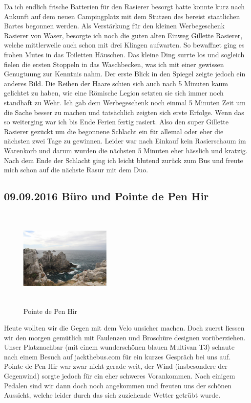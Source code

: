 Da ich endlich frische Batterien für den Rasierer besorgt hatte konnte kurz nach Ankunft auf dem neuen Campingplatz mit dem Stutzen des bereist staatlichen Bartes begonnen werden.
Als Verstärkung für den kleinen Werbegeschenk Rasierer von Waser, besorgte ich noch die guten alten Einweg Gillette Rasierer, welche mittlerweile auch schon mit drei Klingen aufwarten.
So bewaffnet ging es frohen Mutes in das Toiletten Häuschen.
Das kleine Ding surrte los und sogleich fielen die ersten Stoppeln in das Waschbecken, was ich mit einer gewissen Genugtuung zur Kenntnis nahm.
Der erste Blick in den Spiegel zeigte jedoch ein anderes Bild.
Die Reihen der Haare schien sich auch nach 5 Minuten kaum gelichtet zu haben, wie eine Römische Legion setzten sie sich immer noch standhaft zu Wehr.
Ich gab dem Werbegeschenk noch einmal 5 Minuten Zeit um die Sache besser zu machen und tatsächlich zeigten sich erste Erfolge.
Wenn das so weiterging war ich bis Ende Ferien fertig rasiert.
Also den super Gillette Rasierer gezückt um die begonnene Schlacht ein für allemal oder eher die nächsten zwei Tage zu gewinnen.
Leider war nach Einkauf kein Rasierschaum im Warenkorb und darum wurden die nächsten 5 Minuten eher hässlich und kratzig.
Nach dem Ende der Schlacht ging ich leicht blutend zurück zum Bus und \glqq freute\grqq{} mich schon auf die nächste Rasur mit dem Duo.

\subsection{09.09.2016 Büro und Pointe de Pen Hir}

\begin{figure} 
  \begin{centering}
    \includegraphics[width=0.4\textwidth, height=5cm, keepaspectratio]{../Bilder/Bretagne/62.jpg}
    \caption{Pointe de Pen Hir}
  \end{centering}
\end{figure} 

Heute wollten wir die Gegen mit dem Velo unsicher machen.
Doch zuerst liessen wir den morgen gemütlich mit Faulenzen und Broschüre designen vorüberziehen.
Unser Platznachbar (mit einem wunderschönen blauen Multivan T3) schaute nach einem Besuch auf jackthebus.com für ein kurzes Gespräch bei uns auf.
Pointe de Pen Hir war zwar nicht gerade weit, der Wind (insbesondere der Gegenwind) sorgte jedoch für ein eher schweres Vorankommen.
Nach einigem Pedalen sind wir dann doch noch angekommen und freuten uns der schönen Aussicht, welche leider durch das sich zuziehende Wetter getrübt wurde.

